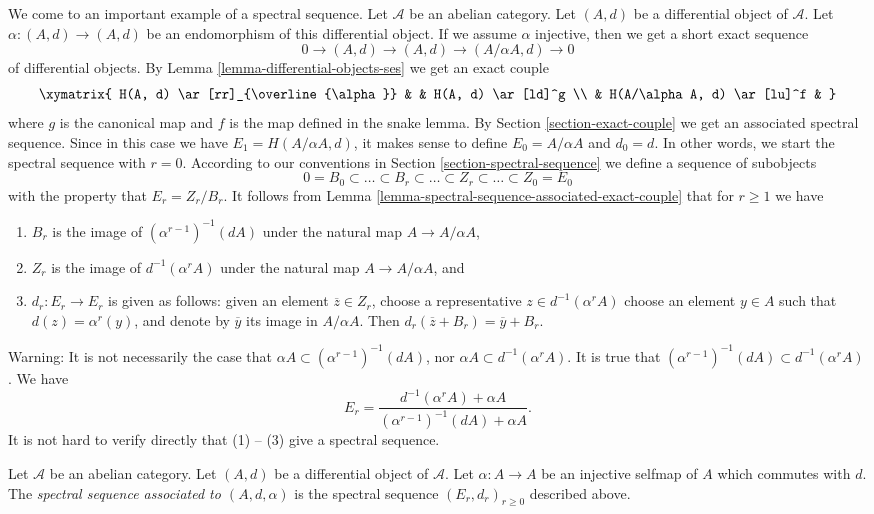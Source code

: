 \noindent
We come to an important example of a spectral sequence.
Let $\mathcal{A}$ be an abelian category.
Let $(A, d)$ be a differential object of $\mathcal{A}$.
Let $\alpha : (A, d) \to (A, d)$ be an endomorphism of this differential
object. If we assume $\alpha$ injective, then we get a short exact sequence
$$
0 \to (A, d) \to (A, d) \to (A/\alpha A, d) \to 0
$$
of differential objects. By
Lemma \ref{lemma-differential-objects-ses} we get an exact couple
$$
\xymatrix{
H(A, d) \ar[rr]_{\overline{\alpha}} & & H(A, d) \ar[ld]^g \\
& H(A/\alpha A, d) \ar[lu]^f &
}
$$
where $g$ is the canonical map and $f$ is the map defined in the snake lemma.
By Section \ref{section-exact-couple} we get an associated spectral sequence.
Since in this case we have $E_1 = H(A/\alpha A, d)$,
it makes sense to define $E_0 = A/\alpha A$ and $d_0 = d$.
In other words, we start the spectral sequence
with $r = 0$. According to our conventions in
Section \ref{section-spectral-sequence} we define a sequence of subobjects
$$
0 = B_0 \subset \ldots \subset B_r \subset \ldots
\subset Z_r \subset \ldots \subset Z_0 = E_0
$$
with the property that $E_r = Z_r/B_r$. It follows from
Lemma \ref{lemma-spectral-sequence-associated-exact-couple}
that for $r \geq 1$ we have
\begin{enumerate}
\item $B_r$ is the image of $(\alpha^{r - 1})^{-1}(d A)$
under the natural map $A \to A/\alpha A$,
\item $Z_r$ is the image of $d^{-1}(\alpha^r A)$
under the natural map $A \to A/\alpha A$, and
\item $d_r : E_r \to E_r$ is given as follows: given an element $\overline{z} \in Z_r$, choose a representative $z \in d^{-1}(\alpha^r A)$
choose an element $y \in A$ such that $d(z) = \alpha^r(y)$, and denote by $\overline{y}$ its image in $A/\alpha A$. Then
$d_r(\overline{z} + B_r) = \overline{y} + B_r$.
\end{enumerate}
Warning: It is not necessarily the case that
$\alpha A \subset (\alpha^{r - 1})^{-1}(dA)$, nor
$\alpha A \subset d^{-1}(\alpha^r A)$. It is true that
$(\alpha^{r - 1})^{-1}(dA) \subset d^{-1}(\alpha^r A)$.
We have
$$
E_r
=
\frac{d^{-1}(\alpha^r A) + \alpha A}{(\alpha^{r - 1})^{-1}(dA) + \alpha A}.
$$
It is not hard to verify directly that (1) -- (3) give a spectral sequence.

\begin{definition}
\label{definition-differential-object-selfmap}
Let $\mathcal{A}$ be an abelian category.
Let $(A, d)$ be a differential object of $\mathcal{A}$.
Let $\alpha : A \to A$ be an injective selfmap of $A$ which
commutes with $d$. The {\it spectral sequence associated to
$(A, d, \alpha)$} is the spectral sequence
$(E_r, d_r)_{r \geq 0}$ described above.
\end{definition}

